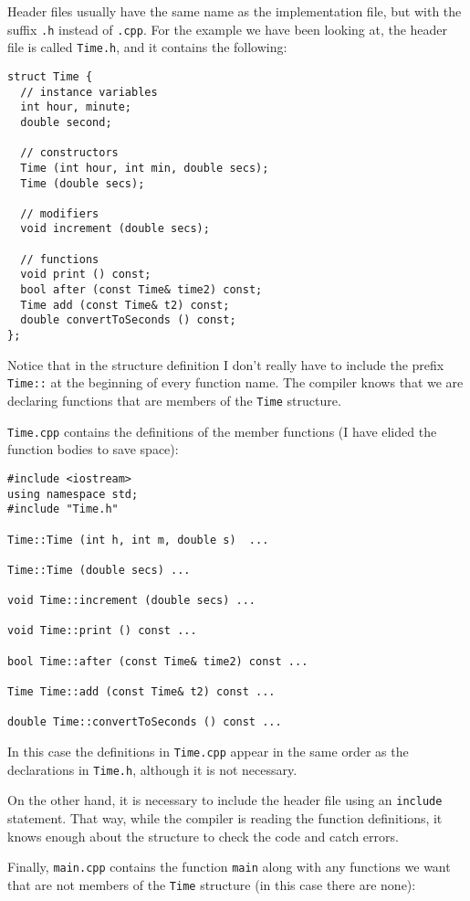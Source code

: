 Header files usually have the same name as the implementation
file, but with the suffix {\tt .h} instead of {\tt .cpp}.  For
the example we have been looking at, the header file is called
{\tt Time.h}, and it contains the following:

\begin{verbatim}
struct Time {
  // instance variables
  int hour, minute;
  double second;

  // constructors
  Time (int hour, int min, double secs);
  Time (double secs);

  // modifiers
  void increment (double secs);

  // functions
  void print () const;
  bool after (const Time& time2) const;
  Time add (const Time& t2) const;
  double convertToSeconds () const;
};
\end{verbatim}
%
Notice that in the structure definition I don't really have
to include the prefix {\tt Time::} at the beginning of every
function name.  The compiler knows that we are declaring functions
that are members of the {\tt Time} structure.

{\tt Time.cpp} contains the definitions of the member functions
(I have elided the function bodies to save space):

\begin{verbatim}
#include <iostream>
using namespace std;
#include "Time.h"

Time::Time (int h, int m, double s)  ...

Time::Time (double secs) ...

void Time::increment (double secs) ...

void Time::print () const ...

bool Time::after (const Time& time2) const ...

Time Time::add (const Time& t2) const ...

double Time::convertToSeconds () const ...
\end{verbatim}
%
In this case the definitions in {\tt Time.cpp} appear in the
same order as the declarations in {\tt Time.h}, although it
is not necessary.

On the other hand, it is necessary to include the header
file using an {\tt include} statement.  That way, while the
compiler is reading the function definitions, it knows enough
about the structure to check the code and catch errors.

Finally, {\tt main.cpp} contains the function {\tt main} along
with any functions we want that are not members of the {\tt Time}
structure (in this case there are none):

